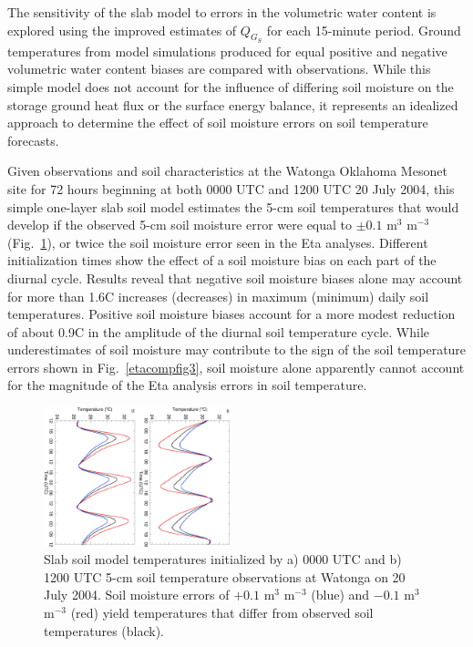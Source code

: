 \documentclass[twocolumn]{article}
\begin{document}
The sensitivity of the slab model to errors in the volumetric water content is explored using the improved estimates of $Q_{G_S}$ for each 15-minute period.  Ground temperatures from model simulations produced for equal positive and negative volumetric water content biases are compared with observations.  While this simple model does not account for the influence of differing soil moisture on the storage ground heat flux or the surface energy balance, it represents an idealized approach to determine the effect of soil moisture errors on soil temperature forecasts.

Given observations and soil characteristics at the Watonga Oklahoma Mesonet site for 72 hours beginning at both 0000 UTC and 1200 UTC 20 July 2004, this simple one-layer slab soil model estimates the 5-cm soil temperatures that would develop if the observed 5-cm soil moisture error were equal to $\pm0.1$ m$^3$ m$^{-3}$ (Fig.~\ref{etacompfig9}), or twice the soil moisture error seen in the Eta analyses.  Different initialization times show the effect of a soil moisture bias on each part of the diurnal cycle.  Results reveal that negative soil moisture biases alone may account for more than 1.6{\textdegree}C increases (decreases) in maximum (minimum) daily soil temperatures.  Positive soil moisture biases account for a more modest reduction of about 0.9{\textdegree}C in the amplitude of the diurnal soil temperature cycle.  While underestimates of soil moisture may contribute to the sign of the soil temperature errors shown in Fig.~\ref{etacompfig3}, soil moisture alone apparently cannot account for the magnitude of the Eta analysis errors in soil temperature.
\begin{figure}[!t] %
\begin{center}
\includegraphics[angle=90, width=0.48\textwidth]{etacompfig9col}
\end{center}
\caption{
Slab soil model temperatures initialized by a) 0000 UTC
and b) 1200 UTC 5-cm soil temperature observations at Watonga on 20
July 2004.  Soil moisture errors of $+0.1$ m$^3$ m$^{-3}$ (blue) and
$-0.1$ m$^3$ m$^{-3}$ (red) yield temperatures that differ from
observed soil temperatures (black).
\label{etacompfig9}
}
\end{figure}
\end{document}
